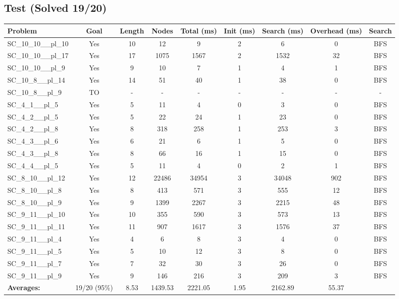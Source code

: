 \documentclass{article}
\begin{document}
\subsection*{Test (Solved 19/20)}
\begin{tabular}{lcccccccc}
\toprule
Problem & Goal & Length & Nodes & Total (ms) & Init (ms) & Search (ms) & Overhead (ms) & Search \\
\midrule
SC\_10\_10\_\_pl\_10 & Yes & 10 & 12 & 9 & 2 & 6 & 0 & BFS \\
SC\_10\_10\_\_pl\_17 & Yes & 17 & 1075 & 1567 & 2 & 1532 & 32 & BFS \\
SC\_10\_10\_\_pl\_9 & Yes & 9 & 10 & 7 & 1 & 4 & 1 & BFS \\
SC\_10\_8\_\_pl\_14 & Yes & 14 & 51 & 40 & 1 & 38 & 0 & BFS \\
SC\_10\_8\_\_pl\_9 & TO & - & - & - & - & - & - & - \\
SC\_4\_1\_\_pl\_5 & Yes & 5 & 11 & 4 & 0 & 3 & 0 & BFS \\
SC\_4\_2\_\_pl\_5 & Yes & 5 & 22 & 24 & 1 & 23 & 0 & BFS \\
SC\_4\_2\_\_pl\_8 & Yes & 8 & 318 & 258 & 1 & 253 & 3 & BFS \\
SC\_4\_3\_\_pl\_6 & Yes & 6 & 21 & 6 & 1 & 5 & 0 & BFS \\
SC\_4\_3\_\_pl\_8 & Yes & 8 & 66 & 16 & 1 & 15 & 0 & BFS \\
SC\_4\_4\_\_pl\_5 & Yes & 5 & 11 & 4 & 0 & 2 & 1 & BFS \\
SC\_8\_10\_\_pl\_12 & Yes & 12 & 22486 & 34954 & 3 & 34048 & 902 & BFS \\
SC\_8\_10\_\_pl\_8 & Yes & 8 & 413 & 571 & 3 & 555 & 12 & BFS \\
SC\_8\_10\_\_pl\_9 & Yes & 9 & 1399 & 2267 & 3 & 2215 & 48 & BFS \\
SC\_9\_11\_\_pl\_10 & Yes & 10 & 355 & 590 & 3 & 573 & 13 & BFS \\
SC\_9\_11\_\_pl\_11 & Yes & 11 & 907 & 1617 & 3 & 1576 & 37 & BFS \\
SC\_9\_11\_\_pl\_4 & Yes & 4 & 6 & 8 & 3 & 4 & 0 & BFS \\
SC\_9\_11\_\_pl\_5 & Yes & 5 & 10 & 12 & 3 & 8 & 0 & BFS \\
SC\_9\_11\_\_pl\_7 & Yes & 7 & 32 & 30 & 3 & 26 & 0 & BFS \\
SC\_9\_11\_\_pl\_9 & Yes & 9 & 146 & 216 & 3 & 209 & 3 & BFS \\
\textbf{Averages:} & 19/20 (95\%) & 8.53 & 1439.53 & 2221.05 & 1.95 & 2162.89 & 55.37 & \\
\bottomrule
\end{tabular}
\\[0.7cm]
\end{document}
